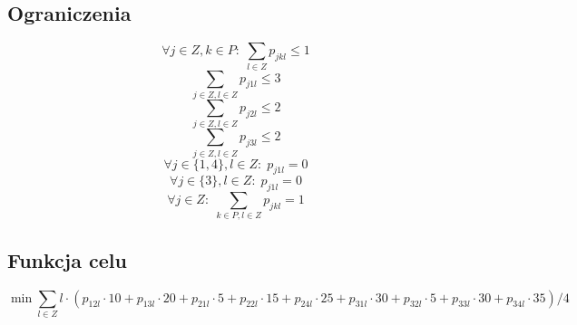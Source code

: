 \documentclass{article}
\begin{document}
\subsection*{Ograniczenia}
$$\forall j \in Z, k \in P: \; \sum_{l \in Z} p_{jkl} \le 1$$
$$\sum_{j \in Z, l \in Z} p_{j1l} \le 3 $$
$$\sum_{j \in Z, l \in Z} p_{j2l} \le 2 $$
$$\sum_{j \in Z, l \in Z} p_{j3l} \le 2 $$
$$\forall j \in \{1, 4\}, l \in Z: \; p_{j1l} = 0$$
$$\forall j \in \{3\}, l \in Z: \; p_{j1l} = 0$$
$$\forall j \in Z: \; \sum_{k \in P, l \in Z} p_{jkl} = 1$$

\subsection*{Funkcja celu}
$$\min{\sum_{l \in Z} l \cdot (
		p_{12l} \cdot 10 +
		p_{13l} \cdot 20 +
		p_{21l} \cdot 5 +
		p_{22l} \cdot 15 +
		p_{24l} \cdot 25 +
		p_{31l} \cdot 30 +
		p_{32l} \cdot 5 +
		p_{33l} \cdot 30 +
		p_{34l} \cdot 35
		) / 4}$$
\end{document}
